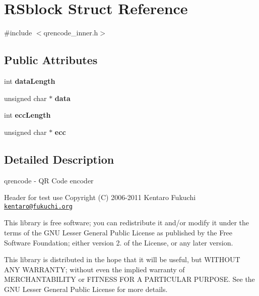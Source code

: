 \hypertarget{struct_r_sblock}{}\section{R\+Sblock Struct Reference}
\label{struct_r_sblock}


{\ttfamily \#include $<$qrencode\+\_\+inner.\+h$>$}

\subsection*{Public Attributes}
\begin{DoxyCompactItemize}
\item 
\mbox{\label{struct_r_sblock_aa92b088de49cdee698c049387d6fef89}} 
int {\bfseries data\+Length}
\item 
\mbox{\label{struct_r_sblock_a4c97255a8476c00d8fe5a8c36b4291a4}} 
unsigned char $\ast$ {\bfseries data}
\item 
\mbox{\label{struct_r_sblock_aaf8a24ab61caca65ac8ab603b350d21f}} 
int {\bfseries ecc\+Length}
\item 
\mbox{\label{struct_r_sblock_a0b2b741266aa6b90fb233138c376b438}} 
unsigned char $\ast$ {\bfseries ecc}
\end{DoxyCompactItemize}


\subsection{Detailed Description}
qrencode -\/ QR Code encoder

Header for test use Copyright (C) 2006-\/2011 Kentaro Fukuchi \href{mailto:kentaro@fukuchi.org}{\tt kentaro@fukuchi.\+org}

This library is free software; you can redistribute it and/or modify it under the terms of the G\+NU Lesser General Public License as published by the Free Software Foundation; either version 2. of the License, or any later version.

This library is distributed in the hope that it will be useful, but W\+I\+T\+H\+O\+UT A\+NY W\+A\+R\+R\+A\+N\+TY; without even the implied warranty of M\+E\+R\+C\+H\+A\+N\+T\+A\+B\+I\+L\+I\+TY or F\+I\+T\+N\+E\+SS F\+OR A P\+A\+R\+T\+I\+C\+U\+L\+AR P\+U\+R\+P\+O\+SE. See the G\+NU Lesser General Public License for more details.

